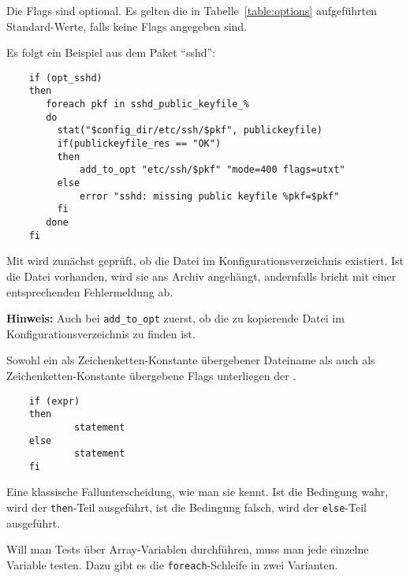     Die Flags sind optional. Es gelten die in Tabelle~\ref{table:options}
    aufgeführten Standard-Werte, falls keine Flags angegeben sind.

    Es folgt ein Beispiel aus dem Paket "`sshd"':

\begin{example}
\begin{verbatim}
    if (opt_sshd)
    then
       foreach pkf in sshd_public_keyfile_%
       do
         stat("$config_dir/etc/ssh/$pkf", publickeyfile)
         if(publickeyfile_res == "OK")
         then
             add_to_opt "etc/ssh/$pkf" "mode=400 flags=utxt"
         else
             error "sshd: missing public keyfile %pkf=$pkf"
         fi
       done
    fi
\end{verbatim}
\end{example}

    Mit  wird zunächst geprüft, ob die
    Datei im Konfigurationsverzeichnis existiert. Ist die Datei vorhanden, wird
    sie ans Archiv angehängt, andernfalls bricht  mit einer
    entsprechenden Fehlermeldung ab.

    \textbf{Hinweis:} Auch bei \texttt{add\_to\_opt}
      zuerst, ob die zu
    kopierende Datei im Konfigurationsverzeichnis zu finden ist.

    Sowohl ein als Zeichenketten-Konstante übergebener Dateiname als auch als
    Zeichenketten-Konstante übergebene Flags unterliegen der
    .


\begin{example}
\begin{verbatim}
    if (expr)
    then
            statement
    else
            statement
    fi
\end{verbatim}
\end{example}

    Eine klassische Fallunterscheidung, wie man sie kennt. Ist die
    Bedingung wahr, wird der \texttt{then}-Teil ausgeführt, ist die Bedingung
    falsch, wird der \texttt{else}-Teil ausgeführt.

    Will man Tests über Array-Variablen durchführen, muss man jede einzelne
    Variable testen. Dazu gibt es die \texttt{foreach}-Schleife in zwei
    Varianten.

